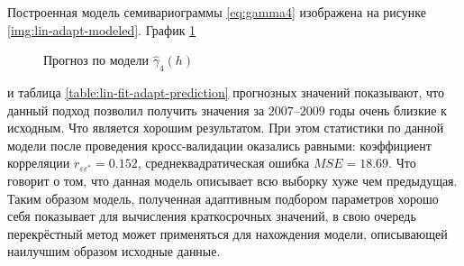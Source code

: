 Построенная модель семивариограммы \eqref{eq:gamma4} изображена на рисунке \ref{img:lin-adapt-modeled}. График \ref{img:lin-adapt-pred}
\begin{figure}[ht]
\caption{Прогноз по модели $ \widehat{\gamma}_4(h) $}
\label{img:lin-adapt-pred}
\end{figure}
и таблица \ref{table:lin-fit-adapt-prediction} прогнозных значений показывают, что данный подход позволил получить значения за $ 2007 $--$ 2009 $ годы очень близкие к исходным. Что является хорошим результатом. При этом статистики по данной модели после проведения кросс-валидации оказались равными: коэффициент корреляции $ r_{\varepsilon\varepsilon^{*}} = 0.152 $, среднеквадратическая ошибка $ MSE = 18.69 $. Что говорит о том, что данная модель описывает всю выборку хуже чем предыдущая. Таким образом модель, полученная адаптивным подбором параметров хорошо себя показывает для вычисления краткосрочных значений, в свою очередь перекрёстный метод может применяться для нахождения модели, описывающей наилучшим образом исходные данные.


